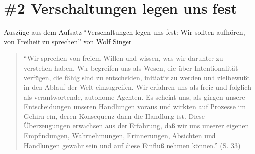 \documentclass[
  a4paper,
]{report}
\begin{document}
\hypertarget{pr-ev2}{%
\section{\#2 Verschaltungen legen uns fest}\label{pr-ev2}}

Auszüge aus dem Aufsatz ``Verschaltungen legen uns fest: Wir sollten aufhören, von Freiheit zu sprechen'' von Wolf Singer \citeyearpar{Singer2004}

\begin{quote}
``Wir sprechen von freiem Willen und wissen, was wir darunter zu verstehen haben. Wir begreifen uns als Wesen, die über Intentionalität verfügen, die fähig sind zu entscheiden, initiativ zu werden und zielbewußt in den Ablauf der Welt einzugreifen. Wir erfahren uns als freie und folglich als verantwortende, autonome Agenten. Es scheint uns, als gingen unsere Entscheidungen unseren Handlungen voraus und wirkten auf Prozesse im Gehirn ein, deren Konsequenz dann die Handlung ist. Diese Überzeugungen erwachsen aus der Erfahrung, daß wir uns unserer eigenen Empfindungen, Wahrnehmungen, Erinnerungen, Absichten und Handlungen gewahr sein und auf diese Einfluß nehmen können.'' (S. 33)
\end{quote}
\end{document}
